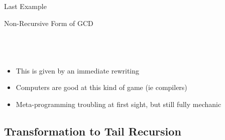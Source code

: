 \begin{frame}{Last Example}
\begin{block}{Non-Recursive Form of GCD}
\begin{columns}
    \begin{column}{.001\linewidth}~\end{column}
  \end{columns}
  \end{block}

  \begin{itemize}
  \item This is given by an immediate rewriting
  \item Computers are good at this kind of game (ie compilers)
  \item Meta-programming troubling at first sight, but still fully mechanic
  \end{itemize}
\end{frame}
\subsection{Transformation to Tail Recursion}
